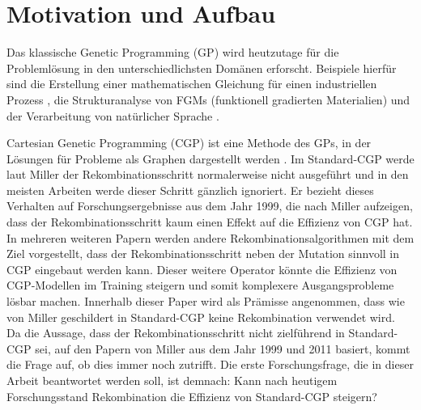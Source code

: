 \chapter{Motivation und Aufbau}
\label{Motivation und Aufbau}

Das klassische Genetic Programming (GP) wird heutzutage für die Problemlösung in den unterschiedlichsten Domänen erforscht.
Beispiele hierfür sind die Erstellung einer mathematischen Gleichung für einen industriellen Prozess \cite{sette_genetic_2001}, die Strukturanalyse von FGMs (funktionell gradierten Materialien) \cite{demirbas_stress_2022} und der Verarbeitung von natürlicher Sprache \cite{araujo_genetic_2020}.

Cartesian Genetic Programming (CGP) ist eine Methode des GPs, in der Lösungen für Probleme als Graphen dargestellt werden \cite{miller_cartesian_2020}. 
Im Standard-CGP werde laut Miller der Rekombinationsschritt normalerweise nicht ausgeführt und in den meisten Arbeiten werde dieser Schritt gänzlich ignoriert. 
Er bezieht dieses Verhalten auf Forschungsergebnisse aus dem Jahr 1999, die nach Miller aufzeigen, dass der Rekombinationsschritt kaum einen Effekt auf die Effizienz von CGP hat. \cite{miller_cartesian_2020} 
In mehreren weiteren Papern werden andere Rekombinationsalgorithmen mit dem Ziel vorgestellt, dass der Rekombinationsschritt neben der Mutation sinnvoll in CGP eingebaut werden kann. 
Dieser weitere Operator könnte die Effizienz von CGP-Modellen im Training steigern und somit komplexere Ausgangsprobleme lösbar machen.
Innerhalb dieser Paper wird als Prämisse angenommen, dass wie von Miller geschildert in Standard-CGP keine Rekombination verwendet wird. \cite{clegg_new_2007,kalkreuth_comprehensive_2020, torabi_using_2022}\\
Da die Aussage, dass der Rekombinationsschritt nicht zielführend in Standard-CGP sei, auf den Papern von Miller aus dem Jahr 1999 und 2011 basiert, kommt die Frage auf, ob dies immer noch zutrifft.
Die erste Forschungsfrage, die in dieser Arbeit beantwortet werden soll, ist demnach: \glqq Kann nach heutigem Forschungsstand Rekombination die Effizienz von Standard-CGP steigern?\grqq

